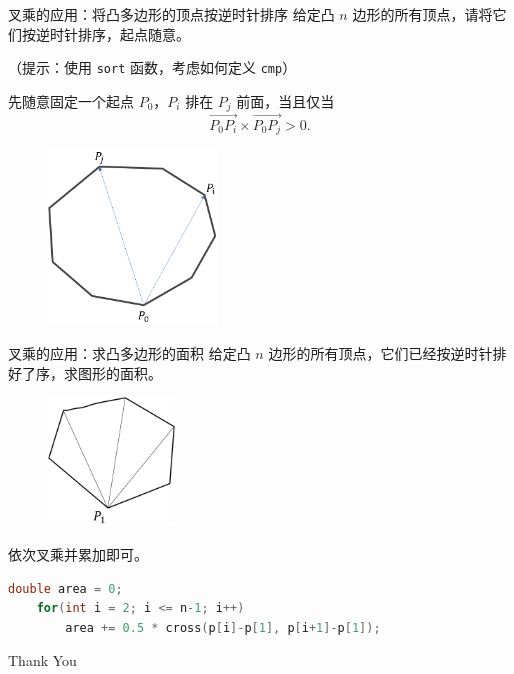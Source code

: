 \documentclass{beamer}
\begin{document}
\begin{frame}[fragile]{叉乘的应用：将凸多边形的顶点按逆时针排序}
    给定凸 $n$ 边形的所有顶点，请将它们按逆时针排序，起点随意。

    （提示：使用 \verb|sort| 函数，考虑如何定义 \verb|cmp|）

    \vspace{1em}\pause
    先随意固定一个起点 $P_0$，$P_i$ 排在 $P_j$ 前面，当且仅当
    \begin{equation*}
        \overrightarrow{P_0P_i} \times \overrightarrow{P_0P_j} > 0.
    \end{equation*}

    \begin{figure}
        \centering
        \includegraphics[width=0.4\textwidth]{pic/sort.png}
    \end{figure}
\end{frame}


\begin{frame}[fragile]{叉乘的应用：求凸多边形的面积}
    给定凸 $n$ 边形的所有顶点，它们已经按逆时针排好了序，求图形的面积。

    \vspace{1em}\pause
    \begin{figure}
        \centering
        \includegraphics[width=0.3\textwidth]{pic/area.png}
    \end{figure}
    依次叉乘并累加即可。
\begin{lstlisting}[language=c++]
    double area = 0;
    for(int i = 2; i <= n-1; i++)
        area += 0.5 * cross(p[i]-p[1], p[i+1]-p[1]);
\end{lstlisting}
\end{frame}


\begin{frame}
    \begin{center}
        {\Huge\calligra Thank You}
    \end{center}
\end{frame}
\end{document}
